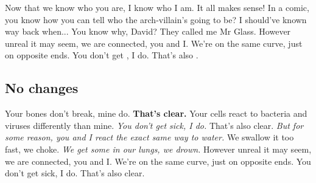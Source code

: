 \documentclass[11pt, a4paper, notitlepage, english]{article}
\begin{document}
Now that we know who you are, I know who I am.
It all makes sense!
In a comic, you know how you can tell who the arch-villain's going to be?
I should've known way back when...
You know why, David?
They called me Mr Glass.
However unreal it may seem, we are connected, you and I.
We're on the same curve, just on opposite ends.
You don't get , I do.
That's also .

\subsection*{No changes}

Your bones don't break, mine do.
\textbf{That's clear.}
Your cells react to bacteria and viruses differently than mine.
\textsl{You don't get sick, I do.}
That's also clear.
\textit{But for some reason, you and I react the exact same way to water.}
We swallow it too fast, we choke.
\emph{We get some in our lungs, we drown.}
However unreal it may seem, we are connected, you and I.
We're on the same curve, just on opposite ends.
You don't get sick, I do.
That's also clear.
\end{document}

